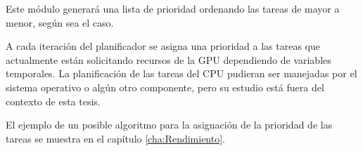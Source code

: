 Este módulo generará una lista de prioridad ordenando las tareas de mayor a menor, según sea el caso.
\newline

A cada iteración del planificador se asigna una prioridad a las tareas que actualmente están solicitando recursos de la GPU dependiendo de variables temporales. La planificación de las tareas del CPU pudieran ser manejadas por el sistema operativo o algún otro componente, pero su estudio está fuera del contexto de esta tesis.
\newline

El ejemplo de un posible algoritmo para la asignación de la prioridad de las tareas se muestra en el capítulo \ref{cha:Rendimiento}.